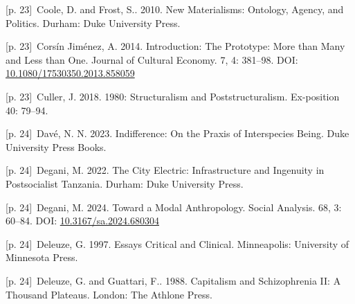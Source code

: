 \documentclass[10pt,a4paper]{article}
\begin{document}
\noindent\begin{minipage}[t]{\linewidth}{\scriptsize\color{gray} [p. 23]}\ Coole, D. and Frost, S.. 2010. New Materialisms: Ontology, Agency, and Politics. Durham: Duke University Press.\par\end{minipage}\par
\noindent\begin{minipage}[t]{\linewidth}{\scriptsize\color{gray} [p. 23]}\ Corsín Jiménez, A. 2014. Introduction: The Prototype: More than Many and Less than One. Journal of Cultural Economy. 7, 4: 381–98. DOI: \url{10.1080/17530350.2013.858059}\par\end{minipage}\par
\noindent\begin{minipage}[t]{\linewidth}{\scriptsize\color{gray} [p. 23]}\ Culler, J. 2018. 1980: Structuralism and Poststructuralism. Ex-position 40: 79–94.\par\end{minipage}\par
\noindent\begin{minipage}[t]{\linewidth}{\scriptsize\color{gray} [p. 24]}\ Davé, N. N. 2023. Indifference: On the Praxis of Interspecies Being. Duke University Press Books.\par\end{minipage}\par
\noindent\begin{minipage}[t]{\linewidth}{\scriptsize\color{gray} [p. 24]}\ Degani, M. 2022. The City Electric: Infrastructure and Ingenuity in Postsocialist Tanzania. Durham: Duke University Press.\par\end{minipage}\par
\noindent\begin{minipage}[t]{\linewidth}{\scriptsize\color{gray} [p. 24]}\ Degani, M. 2024. Toward a Modal Anthropology. Social Analysis. 68, 3: 60–84. DOI: \url{10.3167/sa.2024.680304}\par\end{minipage}\par
\noindent\begin{minipage}[t]{\linewidth}{\scriptsize\color{gray} [p. 24]}\ Deleuze, G. 1997. Essays Critical and Clinical. Minneapolis: University of Minnesota Press.\par\end{minipage}\par
\noindent\begin{minipage}[t]{\linewidth}{\scriptsize\color{gray} [p. 24]}\ Deleuze, G. and Guattari, F.. 1988. Capitalism and Schizophrenia II: A Thousand Plateaus. London: The Athlone Press.\par\end{minipage}\par
\end{document}
